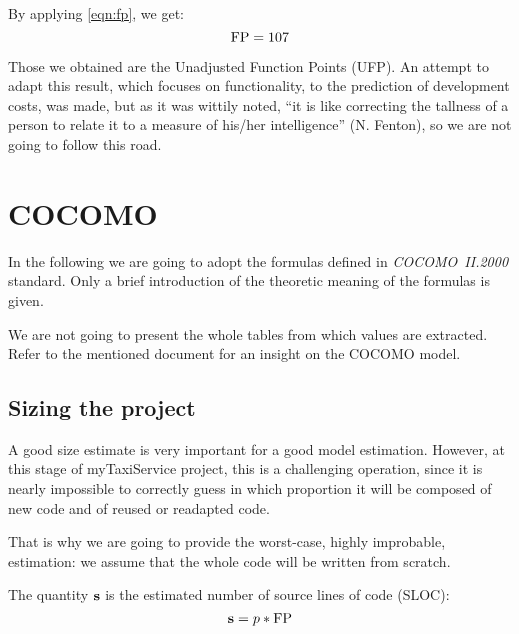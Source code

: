 By applying \cref{eqn:fp}, we get:
\begin{equation}
	\mFP = 107 %
\end{equation}

Those we obtained are the Unadjusted Function Points (UFP). An attempt to adapt this result, which focuses on functionality, to the prediction of development costs, was made, but as it was wittily noted, ``it is like correcting the tallness of a person to relate it to a measure of his/her intelligence'' (N. Fenton), so we are not going to follow this road.























\section{COCOMO}



In the following we are going to adopt the formulas defined in \mbox{\emph{COCOMO II.2000}} standard. Only a brief introduction of the theoretic meaning of the formulas is given. 

We are not going to present the whole tables from which values are extracted. Refer to the mentioned document for an insight on the COCOMO model. 


\subsection{Sizing the project}

A good size estimate is very important for a good model estimation. However, at this stage of myTaxiService project, this is a challenging operation, since it is nearly impossible to correctly guess in which proportion it will be composed of new code and of reused or readapted code.

That is why we are going to provide the \mbox{worst-case}, highly improbable, estimation: we assume that the whole code will be written from scratch. 

The quantity $\mathbf{s}$ is the estimated number of source lines of code (SLOC):
\begin{equation}
%
	\mSize = p * \mFP
%
\end{equation}

